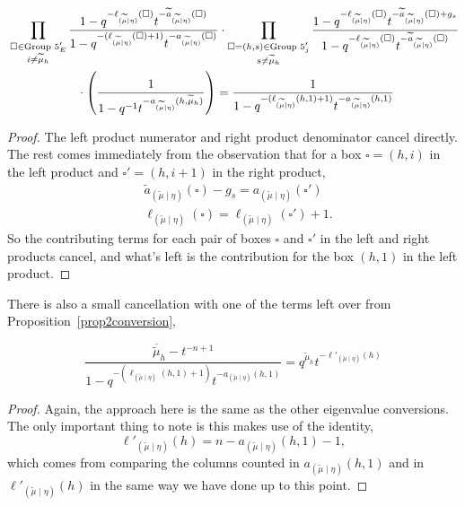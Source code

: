 \documentclass[ALCO]{cedram}
\newcommand{\mutilde}{{\widetilde{\mu}}}
\newcommand{\mutildeeta}{{(\mutilde \mid \eta)}}
\newcommand{\leg}[1]{{\ell_{#1}(\square)}}
\newcommand{\armone}[1]{{\widetilde{a}_{#1}(\square)}}
\newcommand{\armtwo}[1]{{a_{#1}(\square)}}
\newcommand{\group}[1]{\operatorname{Group}\,\operatorname{#1}}
\begin{document}
\begin{prop}\label{group5cance3llation}
\begin{align*} &\prod\limits_{\substack{\square \in \group{5}'_E \\  i\neq \mutilde_h}} \frac{  1-q^{-\leg{\mutildeeta}}t^{-\armone{\mutildeeta}}}{ 1-q^{-(\leg{\mutildeeta}+1)}t^{-\armtwo{\mutildeeta}}} \cdot \prod_{\substack{\square = (h,s) \in \group{5}'_j \\ s\neq \mutilde_h}} \frac{1-q^{-\leg{\mutildeeta}}t^{-\armone{\mutildeeta}+g_s}}{1-q^{-\leg{\mutildeeta}}t^{-\armone{\mutildeeta}}} \\ &\hspace*{2cm}\cdot \left(\frac{1}{1-q^{-1}t^{-a_\mutildeeta(h,\mutilde_h)}}\right)  = \frac{1}{1-q^{-(\ell_{\mutildeeta}(h,1)+1)}t^{-a_\mutildeeta(h,1)}}\end{align*}
\end{prop}
\begin{proof}
The left product numerator and right product denominator cancel directly. The rest comes immediately from the observation that for a box $\square = (h,i)$ in the left product and $\square' = (h,i+1)$ in the right product,
\begin{align*}
    &\armone{\mutildeeta} - g_s = a_\mutildeeta(\square')\\
    & \leg{\mutildeeta} = \ell_\mutildeeta(\square')+1.
\end{align*}
So the contributing terms for each pair of boxes $\square$ and $\square'$ in the left and right products cancel, and what's left is the contribution for the box $(h,1)$ in the left product.
\end{proof}


There is also a small cancellation with one of the terms left over from Proposition~\ref{prop2conversion},
\begin{prop}
\[\frac{\overline{\mutilde}_h-t^{-n+1}}{1-q^{-(\ell_{\mutildeeta}(h,1)+1)}t^{-a_\mutildeeta(h,1)}} = q^{\mutilde_h}t^{-\ell'_\mutildeeta(h)}\]
\end{prop}
\begin{proof}
Again, the approach here is the same as the other eigenvalue conversions. The only important thing to note is this makes use of the identity,
\[ \ell'_\mutildeeta(h) = n-a_\mutildeeta(h,1) - 1,\]
which comes from comparing the columns counted in $a_\mutildeeta(h,1)$ and in $\ell'_\mutildeeta(h)$ in the same way we have done up to this point.
\end{proof}
\end{document}
